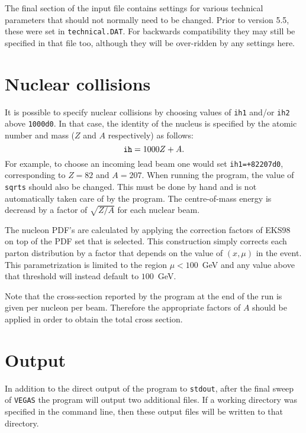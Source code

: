 \documentclass[12pt]{article}
\begin{document}
The final section of the input file contains settings for various technical parameters that should not normally need to be changed. Prior to version 5.5, these were set in {\tt technical.DAT}. For backwards compatibility they may still be specified in that file too, although they will be over-ridden by any settings here.

\section{Nuclear collisions}
\label{sec:nucleus}

It is possible to specify nuclear collisions by choosing values
of {\tt ih1} and/or {\tt ih2} above {\tt 1000d0}. In that case,
the identity of the nucleus is specified by the atomic number
and mass ($Z$ and $A$ respectively) as follows:
\begin{equation}
{\tt ih} = 1000Z+A.
\end{equation}
For example, to choose an incoming lead beam one would set
{\tt ih1=+82207d0}, corresponding to $Z=82$ and $A=207$.
When running the program, the value of {\tt sqrts} should also be
changed. This must be done by hand and is not automatically taken
care of by the
program. The centre-of-mass energy is decreasd by a factor of
$\sqrt{Z/A}$ for each nuclear beam. 

The nucleon PDF's are calculated by applying the correction
factors of EKS98~\cite{Eskola:1998df} on top of the PDF set that is selected.
This construction simply corrects each parton distribution by
a factor that depends on the value of $(x,\mu)$ in the event.
This parametrization is limited to the region $\mu < 100$~GeV and
any value above that threshold will instead default to $100$~GeV.

Note that the cross-section reported by the program at the end
of the run is given per nucleon per beam. Therefore the
appropriate factors of $A$ should be applied in order to obtain
the total cross section.

\section{Output}
 
In addition to the direct output of the program to {\tt stdout}, after
the final sweep of {\tt VEGAS} the program will output two additional files.
If a working directory was specified in the command line, then these
output files will be written to that directory.
\end{document}
